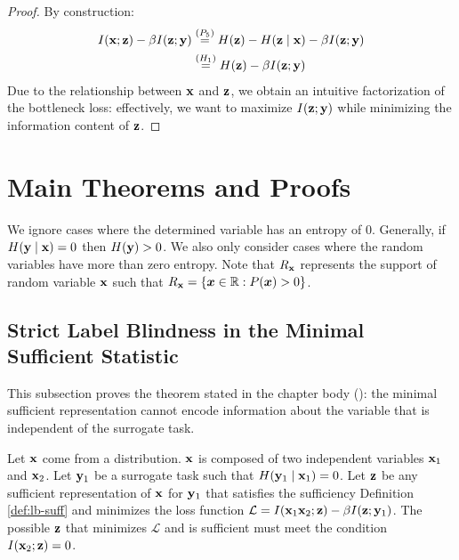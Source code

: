 \begin{proof}
By construction:
\begin{align*} I({\mathbf{x}}; {\mathbf{z}})-\beta I({\mathbf{z}}; {\mathbf{y}}) &\stackrel{\left(P_5\right)}{=} H({\mathbf{z}}) - H({\mathbf{z}} \mid {\mathbf{x}}) -\beta I({\mathbf{z}};{\mathbf{y}}) \\ &\stackrel{\left(H_1\right)}{=} H({\mathbf{z}}) -\beta I({\mathbf{z}}; {\mathbf{y}}) \end{align*}
Due to the relationship between ${\mathbf{x}}$ and ${\mathbf{z}}$, we obtain an intuitive factorization of the bottleneck loss: effectively, we want to maximize $I({\mathbf{z}}; {\mathbf{y}})$ while minimizing the information content of ${\mathbf{z}}$.
\end{proof}

\section{Main Theorems and Proofs}
\label{app:mainproofs}

We ignore cases where the determined variable has an entropy of $0$. Generally, if $H({\mathbf{y}} \mid {\mathbf{x}}) = 0$ then $H({\mathbf{y}}) > 0$. We also only consider cases where the random variables have more than zero entropy. Note that $R_{{\mathbf{x}}}$ represents the support of random variable ${\mathbf{x}}$ such that $R_{{\mathbf{x}}} = \{{\bm{x}} \in \mathbb{R} : P({\bm{x}}) > 0\}$.

\subsection{Strict Label Blindness in the Minimal Sufficient Statistic}
\label{app:genloss}

This subsection proves the theorem stated in the chapter body (): the minimal sufficient representation cannot encode information about the variable that is independent of the surrogate task.

\begin{theorem}
Let ${\mathbf{x}}$ come from a distribution. ${\mathbf{x}}$ is composed of two independent variables ${\mathbf{x}}_1$ and ${\mathbf{x}}_2$. Let ${\mathbf{y}}_1$ be a surrogate task such that $H({\mathbf{y}}_1 \mid {\mathbf{x}}_1) = 0$. Let ${\mathbf{z}}$ be any sufficient representation of ${\mathbf{x}}$ for ${\mathbf{y}}_1$ that satisfies the sufficiency Definition \ref{def:lb-suff} and minimizes the loss function $\mathcal{L} = I({\mathbf{x}}_1 {\mathbf{x}}_2; {\mathbf{z}}) - \beta I({\mathbf{z}};{\mathbf{y}}_1)$. The possible ${\mathbf{z}}$ that minimizes $\mathcal{L}$ and is sufficient must meet the condition $I({\mathbf{x}}_2; {\mathbf{z}}) = 0$.
\label{genloss}
\end{theorem}

